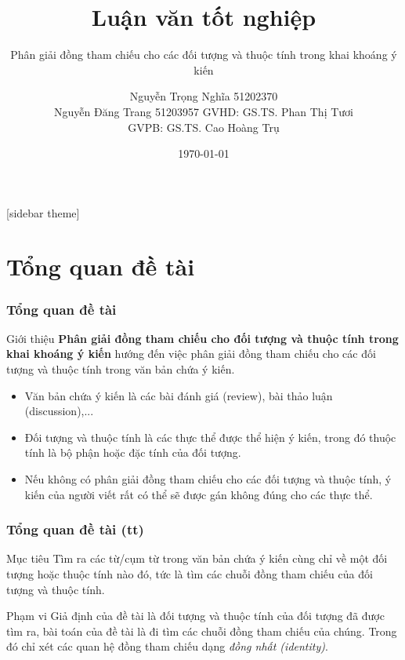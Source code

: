 \documentclass{beamer}
\title{Luận văn tốt nghiệp}
\subtitle{Phân giải đồng tham chiếu cho các đối tượng và thuộc tính trong khai khoáng ý kiến}
\author[]{Nguyễn Trọng Nghĩa 51202370 \\ Nguyễn Đăng Trang 51203957 \break \break GVHD: GS.TS. Phan Thị Tươi \\ GVPB: GS.TS. Cao Hoàng Trụ}
\institute{Đại học Bách Khoa TP. Hồ Chí Minh}
\date{\today}
\begin{document}
	
	[sidebar theme]
	\begin{frame}
		\titlepage
	\end{frame}

	\section{Tổng quan đề tài}
	\begin{frame}
		\frametitle{Tổng quan đề tài}
		\begin{block}{Giới thiệu}
			\textbf{Phân giải đồng tham chiếu cho đối tượng và thuộc tính trong khai khoáng ý kiến} hướng đến việc phân giải đồng tham chiếu cho các đối tượng và thuộc tính trong văn bản chứa ý kiến.	
			\begin{itemize}				
				\item{Văn bản chứa ý kiến là các bài đánh giá (review), bài thảo luận (discussion),...}
				\item{Đối tượng và thuộc tính là các thực thể được thể hiện ý kiến, trong đó thuộc tính là bộ phận hoặc đặc tính của đối tượng.}
				\item{Nếu không có phân giải đồng tham chiếu cho các đối tượng và thuộc tính, ý kiến của người viết rất có thể sẽ được gán không đúng cho các thực thể.}
			\end{itemize}		
		\end{block}		
	\end{frame}

	\begin{frame}
		\frametitle{Tổng quan đề tài (tt)}
		\begin{block}{Mục tiêu}
			Tìm ra các từ/cụm từ trong văn bản chứa ý kiến cùng chỉ về một đối tượng hoặc thuộc tính nào đó, tức là tìm các chuỗi đồng tham chiếu của đối tượng và thuộc tính.
		\end{block}		
		\begin{block}{Phạm vi}
			Giả định của đề tài là đối tượng và thuộc tính của đối tượng đã được tìm ra, bài toán của đề tài là đi tìm các chuỗi đồng tham chiếu của chúng. Trong đó chỉ xét các quan hệ đồng tham chiếu dạng \textit{đồng nhất (identity)}. 
		\end{block}
	\end{frame}
\end{document}
